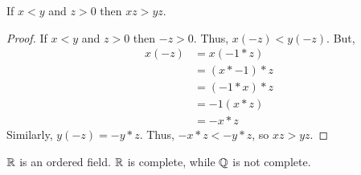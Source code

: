\begin{theorem}{}{}
    If $x < y$ and $z > 0$ then $xz > yz$.
\end{theorem}
\begin{proof}
    If $x < y$ and $z > 0$ then $-z > 0$. Thus, $x(-z) < y(-z)$. But,
    \begin{align*}
        x(-z) &= x(-1 * z) \\
        &= (x * -1) * z \\
        &= (-1 * x) * z \\
        &= -1 (x * z) \\
        &= -x * z
    \end{align*}
    Similarly, $y(-z) = -y * z$. Thus, $-x * z < -y * z$, so $xz > yz$.
\end{proof}

\begin{note}
    $\mathbb{R}$ is an ordered field. $\mathbb{R}$ is complete, while $\mathbb{Q}$ is not complete.
\end{note}